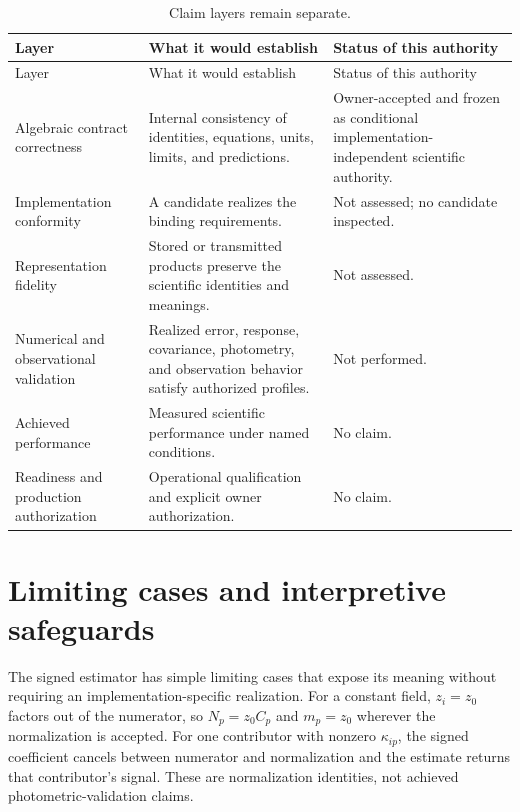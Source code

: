 \documentclass[11pt]{article}
\begin{document}
\begin{longtable}{@{}>{\raggedright\arraybackslash}p{}
                        >{\raggedright\arraybackslash}p{}
                        >{\raggedright\arraybackslash}p{}@{}}
\caption{Claim layers remain separate.}\label{tab:claim-layers}\\
\toprule
Layer & What it would establish & Status of this authority \\
\midrule
\endfirsthead
\toprule
Layer & What it would establish & Status of this authority \\
\midrule
\endhead
Algebraic contract correctness & Internal consistency of identities,
equations, units, limits, and predictions. & Owner-accepted and frozen as
conditional implementation-independent scientific authority. \\
Implementation conformity & A candidate realizes the binding requirements. &
Not assessed; no candidate inspected. \\
Representation fidelity & Stored or transmitted products preserve the
scientific identities and meanings. & Not assessed. \\
Numerical and observational validation & Realized error, response, covariance,
photometry, and observation behavior satisfy authorized profiles. & Not
performed. \\
Achieved performance & Measured scientific performance under named
conditions. & No claim. \\
Readiness and production authorization & Operational qualification and explicit
owner authorization. & No claim. \\
\bottomrule
\end{longtable}

\section{Limiting cases and interpretive safeguards}
\label{sec:limiting-cases}

The signed estimator has simple limiting cases that expose its meaning without
requiring an implementation-specific realization.  For a constant field,
$z_i=z_0$ factors out of the numerator, so $N_p=z_0C_p$ and $m_p=z_0$ wherever
the normalization is accepted.  For one contributor with nonzero
$\kappa_{ip}$, the signed coefficient cancels between numerator and
normalization and the estimate returns that contributor's signal.  These are
normalization identities, not achieved photometric-validation claims.
\end{document}
